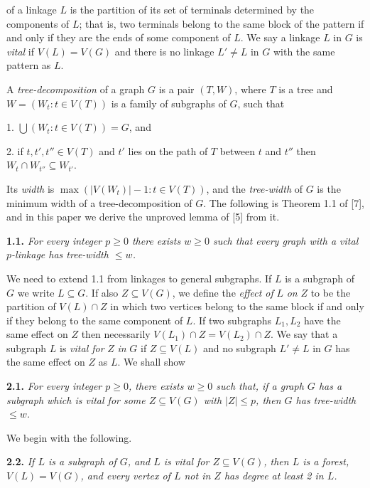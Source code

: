\noindent of a linkage $L$ is the partition of its set of terminals determined by the components of $L$; that is, two terminals belong to the same block of the pattern if and only if they are the ends of some component of $L$. We say a linkage $L$ in $G$ is \textit{vital} if $V(L) = V(G)$ and there is no linkage $L' \ne L$ in $G$ with the same pattern as $L$.

A \textit{tree-decomposition} of a graph $G$ is a pair $(T, W)$, where $T$ is a tree and $W = (W_t : t \in V(T))$ is a family of subgraphs of $G$, such that

\hspace*{12pt}1. $\bigcup(W_t : t \in V(T)) = G$, and

\hspace*{12pt}2. if $t, t', t'' \in V(T)$ and $t'$ lies on the path of $T$ between $t$ and $t''$ then $W_t \cap W_{t''} \subseteq W_{t'}$.

Its \textit{width} is $\max (|V(W_t)| - 1 : t \in V(T))$, and the \textit{tree-width} of $G$ is the minimum width of a tree-decomposition of $G$. The following is Theorem 1.1 of [7], and in this paper we derive the unproved lemma of [5] from it.

\textbf{1.1.} \textit{For every integer $p \ge 0$ there exists $w \ge 0$ such that every graph with a vital $p$-linkage has tree-width $\le w$.}


We need to extend 1.1 from linkages to general subgraphs. If $L$ is a subgraph of $G$ we write $L \subseteq G$. If also $Z \subseteq V(G)$, we define the \textit{effect of} $L$ \textit{on} $Z$ to be the partition of $V(L) \cap Z$ in which two vertices belong to the same block if and only if they belong to the same component of $L$. If two subgraphs $L_1, L_2$ have the same effect on $Z$ then necessarily $V(L_1) \cap Z = V(L_2) \cap Z$. We say that a subgraph $L$ is \textit{vital for} $Z$ \textit{in} $G$ if $Z \subseteq V(L)$ and no subgraph $L' \ne L$ in $G$ has the same effect on $Z$ as $L$. We shall show

\textbf{2.1.} \textit{For every integer $p \ge 0$, there exists $w \ge 0$ such that, if a graph $G$ has a subgraph which is vital for some $Z \subseteq V(G)$ with $|Z| \le p$, then $G$ has tree-width $\le w$.}

We begin with the following.

\textbf{2.2.} \textit{If $L$ is a subgraph of $G$, and $L$ is vital for $Z \subseteq V(G)$, then $L$ is a forest, $V(L) = V(G)$, and every vertex of $L$ not in $Z$ has degree at least 2 in $L$.}

